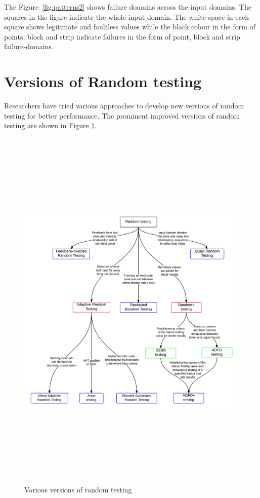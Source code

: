 
The Figure~\ref{fig:patterns2} shows failure domains across the input domains. The squares in the figure indicate the whole input domain. The white space in each square shows legitimate and faultless values while the black colour in the form of points, block and strip indicate failures in the form of point, block and strip failure-domains.

\newpage
\section{Versions of Random testing}
Researchers have tried various approaches to develop new versions of random testing for better performance. The prominent improved versions of random testing are shown in Figure \ref{fig:randomTestingVersions_2}.

\begin{figure}[H]
	\centering
	\centerline{\includegraphics[width=16.5cm, height=18cm]{chapter2/randomTestingVariations.png}}
	\caption{Various versions of random testing}
	\label{fig:randomTestingVersions_2}
\end{figure}

